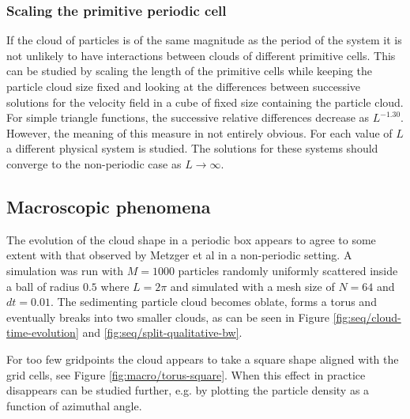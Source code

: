 \documentclass[a4paper,
twoside=false,abstract=false,numbers=noenddot,
titlepage=false,headings=small,parskip=half,version=last]{scrartcl}
\begin{document}
\subsubsection{Scaling the primitive periodic cell}\label{cellscale}
If the cloud of particles is of the same magnitude as the period of the system it is not unlikely to have interactions between clouds of different primitive cells.
This can be studied by scaling the length of the primitive cells while keeping the particle cloud size fixed and looking at the differences between successive solutions for the velocity field in a cube of fixed size containing the particle cloud.
For simple triangle functions, the successive relative differences decrease as $L^{-1.30}$.
However, the meaning of this measure in not entirely obvious.
For each value of $L$ a different physical system is studied. The solutions for these systems should converge to the non-periodic case as $L\rightarrow \infty$.

\subsection{Macroscopic phenomena}
The evolution of the cloud shape in a periodic box appears to agree to some extent with that observed by Metzger et al \cite{fallingclouds} in a non-periodic setting.
A simulation was run with $M=1000$ particles randomly uniformly scattered inside a ball of radius $0.5$ where $L=2\pi$ and simulated with a mesh size of $N=64$ and $dt=0.01$. 
The sedimenting particle cloud becomes oblate, forms a torus and eventually breaks into two smaller clouds, as can be seen in Figure \ref{fig:seq/cloud-time-evolution} and \ref{fig:seq/split-qualitative-bw}.

For too few gridpoints the cloud appears to take a square shape aligned with the grid cells, see Figure \ref{fig:macro/torus-square}. When this effect in practice disappears can be studied further, e.g. by plotting the particle density as a function of azimuthal angle.
\end{document}
